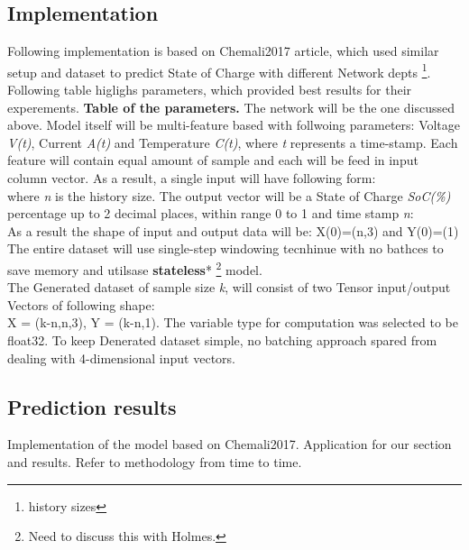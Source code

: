 \subsection{Implementation}
    Following implementation is based on Chemali2017 article, which used similar setup and dataset to predict State of Charge with different Network depts \footnote{history sizes}.
    Following table higlighs parameters, which provided best results for their experements.
    \textbf{Table of the parameters.}
    The network will be the one discussed above.
    Model itself will be multi-feature based with follwoing parameters: Voltage \textit{V(t)}, Current \textit{A(t)} and Temperature \textit{C(t)}, where \textit{t} represents a time-stamp. Each feature will contain equal amount of sample and each will be feed in input column vector. As a result, a single input will have following form: \\
    where \textit{n} is the history size.
    The output vector will be a State of Charge \textit{SoC(\%)} percentage up to 2 decimal places, within range 0 to 1 and time stamp \textit{n}: \\
    As a result the shape of input and output data will be: X(0)=(n,3) and Y(0)=(1)
    The entire dataset will use single-step windowing tecnhinue with no bathces to save memory and utilsase \textbf{stateless}* \footnote{Need to discuss this with Holmes.} model. \\
    The Generated dataset of sample size \textit{k}, will consist of two Tensor input/output Vectors of following shape: \\
    X = (k-n,n,3), Y = (k-n,1).
    The variable type for computation was selected to be float32.
    To keep Denerated dataset simple, no batching approach spared from dealing with 4-dimensional input vectors.
\subsection{Prediction results}


    Implementation of the model based on Chemali2017. Application for our section and results. Refer to methodology from time to time.